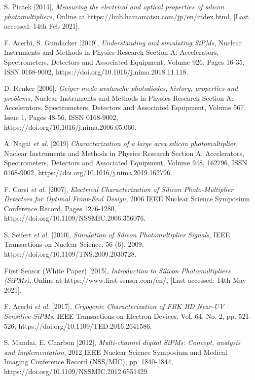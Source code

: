 \begin{thebibliography}{9}
S. Piatek [2014],
\textit{Measuring the electrical and optical properties of silicon photomultipliers},
Online at https://hub.hamamatsu.com/jp/en/index.html,
[Last accessed: 14th Feb 2021].

F. Acerbi, S. Gundacker [2019],
\textit{Understanding and simulating SiPMs},
Nuclear Instruments and Methods in Physics Research Section A: Accelerators, Spectrometers, Detectors and Associated Equipment,
Volume 926, Pages 16-35, ISSN 0168-9002,
https://doi.org/10.1016/j.nima.2018.11.118.

D. Renker [2006],
\textit{Geiger-mode avalanche photodiodes, history, properties and problems},
Nuclear Instruments and Methods in Physics Research Section A: Accelerators, Spectrometers, Detectors and Associated Equipment,
Volume 567, Issue 1, Pages 48-56, ISSN 0168-9002,
https://doi.org/10.1016/j.nima.2006.05.060.

A. Nagai \textit{et al.} [2019]
\textit{Characterization of a large area silicon photomultiplier},
Nuclear Instruments and Methods in Physics Research Section A: Accelerators, Spectrometers, Detectors and Associated Equipment,
Volume 948, 162796, ISSN 0168-9002,
https://doi.org/10.1016/j.nima.2019.162796.

F. Corsi \textit{et al.} [2007],
\textit{Electrical Characterization of Silicon Photo-Multiplier Detectors for Optimal Front-End Design},
2006 IEEE Nuclear Science Symposium Conference Record,
Pages 1276-1280,
https://doi.org/10.1109/NSSMIC.2006.356076.

S. Seifert \textit{et al.} [2010],
\textit{Simulation of Silicon Photomultiplier Signals},
IEEE Transactions on Nuclear Science, 56 (6), 2009,
https://doi.org/10.1109/TNS.2009.2030728.

First Sensor (White Paper) [2015],
\textit{Introduction to Silicon Photomultipliers (SiPMs)},
Online at https://www.first-sensor.com/en/,
[Last accessed: 14th May 2021].

F. Acerbi \textit{et al.} [2017],
\textit{Cryogenic Characterization of FBK HD Near-UV Sensitive SiPMs},
IEEE Transactions on Electron Devices,
Vol. 64, No. 2, pp. 521-526,
https://doi.org/10.1109/TED.2016.2641586.

S. Mandai, E. Charbon [2012],
\textit{Multi-channel digital SiPMs: Concept, analysis and implementation},
2012 IEEE Nuclear Science Symposium and Medical Imaging Conference Record (NSS/MIC),
pp. 1840-1844,
https://doi.org/10.1109/NSSMIC.2012.6551429.


\end{thebibliography}

